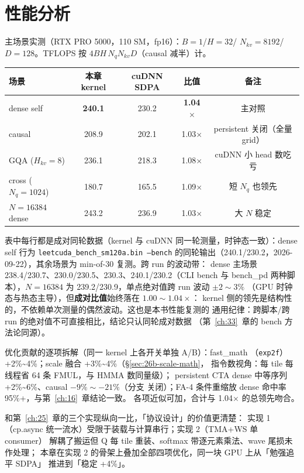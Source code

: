 \section{性能分析}\label{sec:26b-perf}

主场景实测（RTX PRO 5000，110 SM，fp16）：$B{=}1$/$H{=}32$/
$N_{kv}{=}8192$/$D{=}128$。TFLOPS 按 $4BH\,N_qN_{kv}D$（causal 减半）计。

\begin{center}
\begin{tabular}{lcccc}
\toprule
场景 & 本章 kernel & cuDNN SDPA & 比值 & 备注 \\
\midrule
dense self & \textbf{240.1} & 230.2 & \textbf{1.04$\times$} & 主对照 \\
causal & 208.9 & 202.1 & 1.03$\times$ & persistent 关闭（全量 grid） \\
GQA ($H_{kv}{=}8$) & 236.1 & 218.3 & 1.08$\times$ & cuDNN 小 head 数吃亏 \\
cross ($N_q{=}1024$) & 180.7 & 165.5 & 1.09$\times$ & 短 $N_q$ 也领先 \\
$N{=}16384$ dense & 243.2 & 236.9 & 1.03$\times$ & 大 $N$ 稳定 \\
\bottomrule
\end{tabular}
\end{center}

表中每行都是成对同轮数据（kernel 与 cuDNN 同一轮测量，时钟态一致）：dense self
行为 \texttt{leetcuda\_\allowbreak{}bench\_\allowbreak{}sm120a.\allowbreak{}bin --bench}
的同轮输出（240.1/230.2，2026-09-22），其余场景为 min-of-30 复测。跨 run 的波动带：
dense 主场景 238.4/230.7、230.0/230.5、230.3、240.1/230.2（CLI bench 与 bench\_pd
两种脚本），$N{=}16384$ 为 239.2/230.9，单点绝对值跨 run 波动 $\pm2\sim3\%$
（GPU 时钟态与热态主导），但\textbf{成对比值}始终落在 $1.00\sim1.04\times$：
kernel 侧的领先是结构性的，不依赖单次测量的偶然波动。这也是本书性能复测的
通用纪律：跨脚本/跨 run 的绝对值不可直接相比，结论只认同轮成对数据
（第~\ref{ch:33}~章的 bench 方法论同源）。

优化贡献的逐项拆解（同一 kernel 上各开关单独 A/B）：fast\_math
（\texttt{exp2f}）+2\%\textasciitilde4\%；scale 融合 +3\%\textasciitilde4\%（\S\ref{sec:26b-scale-math}，
指令数视角：每 tile 每线程省 64 条 FMUL，与 HMMA 数同量级）；
persistent CTA dense 中等序列 +2\%\textasciitilde6\%、causal $-9\%\sim-21\%$（分支
关闭）；FA-4 条件重缩放 dense 命中率 95\%+，与第~\ref{ch:16}~章结论一致。
各项近似可加，合计与 1.04$\times$ 的总领先吻合。

和第~\ref{ch:25}~章的三个实现纵向一比，「协议设计」的价值更清楚：
实现 1（cp.async 统一流水）受限于装载与计算串行；实现 2（TMA+WS 单 consumer）
解耦了搬运但 Q 每 tile 重装、softmax 带逐元素乘法、wave 尾损未作处理；
本章在实现 2 的骨架上叠加全部四项优化，同一块 GPU 上从「勉强追平 SDPA」
推进到「稳定 +4\%」。

